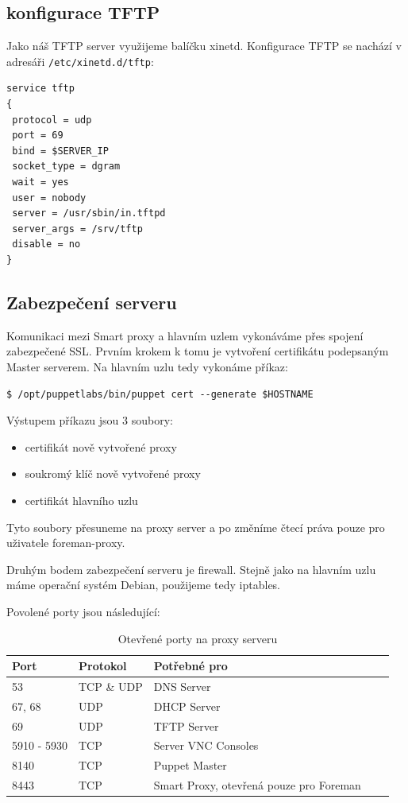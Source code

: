 \documentclass[thesis=B,czech]{FITthesis}[2012/06/26]
\begin{document}
\subsection{konfigurace TFTP}

Jako náš TFTP server využijeme balíčku xinetd. Konfigurace TFTP se nachází v adresáři \texttt{/etc/xinetd.d/tftp}:
\begin{verbatim}
service tftp
{
 protocol = udp
 port = 69
 bind = $SERVER_IP
 socket_type = dgram
 wait = yes
 user = nobody
 server = /usr/sbin/in.tftpd
 server_args = /srv/tftp
 disable = no
}
\end{verbatim}


\subsection{Zabezpečení serveru}

Komunikaci mezi Smart proxy a hlavním uzlem vykonáváme přes spojení zabezpečené SSL. Prvním krokem k tomu je vytvoření certifikátu podepsaným Master serverem. Na hlavním uzlu tedy vykonáme příkaz:


\begin{verbatim}
$ /opt/puppetlabs/bin/puppet cert --generate $HOSTNAME
\end{verbatim}

Výstupem příkazu jsou 3 soubory:
\begin{itemize}
\item certifikát nově vytvořené proxy
\item soukromý klíč nově vytvořené proxy
\item certifikát hlavního uzlu
\end{itemize}

Tyto soubory přesuneme na proxy server a po změníme čtecí práva pouze pro uživatele foreman-proxy.

Druhým bodem zabezpečení serveru je firewall. Stejně jako na hlavním uzlu máme operační systém Debian, použijeme tedy iptables.

Povolené porty jsou následující:

\begin{table}[h]
\centering
\caption{Otevřené porty na proxy serveru}
\label{my-label}
\begin{tabular}{@{}lllll@{}}
\toprule

Port &	Protokol &	Potřebné pro  \\ \midrule
53 &	TCP \& UDP &	DNS Server \\
67, 68 &	UDP &	DHCP  Server \\
69 &	UDP &  TFTP Server \\
5910 - 5930 &	TCP &	Server VNC Consoles \\
8140 &	TCP &	Puppet Master \\
8443 &	TCP &	Smart Proxy, otevřená pouze pro Foreman \\ \bottomrule
\end{tabular}
\end{table}
\end{document}
